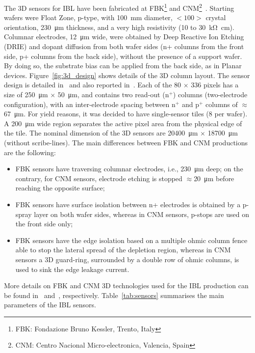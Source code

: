 The 3D sensors for IBL have been fabricated at FBK\footnote{FBK: Fondazione Bruno Kessler, Trento, Italy} and CNM\footnote{CNM: Centro Nacional Micro-electronica, Valencia, Spain}~\cite{ds-cnm,ds-fbk}. Starting wafers were Float Zone, p-type, with \SI{100}{\milli\meter} diameter, $<100>$ crystal orientation, \SI{230}{\micro\meter} thickness, and a very high resistivity (10 to \SI{30}{\kilo\ohm\centi\meter}). Columnar electrodes, \SI{12}{\micro\meter} wide, were obtained by Deep Reactive Ion Etching (DRIE) and dopant diffusion from both wafer sides (n+ columns from the front side, p+ columns from the back side), without the presence of a support wafer. By doing so, the substrate bias can be applied from the back side, as in Planar devices. Figure~\ref{fig:3d_design} shows details of the 3D column layout.
The sensor design is detailed in~\cite{DAVIA_NIMA694_2012} and also reported in~\cite{IBL_mod_proto}. Each of the 80 $\times$ 336 pixels has a size of \SI{250}{\micro\meter} $\times$ \SI{50}{\micro\meter}, and contains two read-out (n$^+$) columns (two-electrode configuration), with an inter-electrode spacing between n$^+$ and p$^+$ columns of $\approx$\SI{67}{\micro\meter}. For yield reasons, it was decided to have single-sensor tiles (8 per wafer). A \SI{200}{\micro\meter} wide region separates the active pixel area from the physical edge of the tile. The nominal dimension of the 3D sensors are \SI{20400}{\micro\meter} $\times$ \SI{18700}{\micro\meter} (without scribe-lines).
The main differences between FBK and CNM productions are the following:
\begin{itemize}
\item FBK sensors have traversing columnar electrodes, i.e., \SI{230}{\micro\meter} deep; on the contrary, for CNM sensors, electrode etching is stopped $\approx$\SI{20}{\micro\meter} before reaching the opposite surface;
\item FBK sensors have surface isolation between n+ electrodes is obtained by a p-spray layer on both wafer sides, whereas in CNM sensors, p-stops are used on the front side only;
\item FBK sensors have the edge isolation based on a multiple ohmic column fence able to stop the lateral spread of the depletion region, whereas in CNM sensors a 3D guard-ring, surrounded by a double row of ohmic columns, is used to sink the edge leakage current.
\end{itemize}
More details on FBK and CNM 3D technologies used for the IBL production can be found in~\cite{GIACOMINI_TNS_13} and~\cite{PELLEGRINI_NIMA_13}, respectively. Table~\ref{tab:sensors} summarises the main parameters of  the IBL sensors. 



